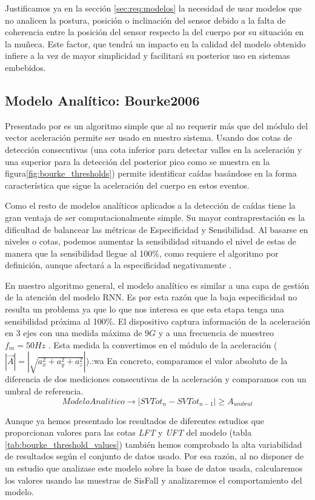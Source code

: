 Justificamos ya en la sección \ref{sec:req:modelos} la necesidad de usar modelos que no analicen la postura, posición o inclinación del sensor debido a la falta de coherencia entre la posición del sensor respecto la del cuerpo por su situación en la muñeca. Este factor, que tendrá un impacto en la calidad del modelo obtenido infiere a la vez de mayor simplicidad y facilitará su posterior uso en sistemas embebidos.

\subsection{Modelo Analítico: Bourke2006}\label{sub:imp:model:analitico}

Presentado por  es un algoritmo simple que al no requerir más que del módulo del vector aceleración permite ser usado en nuestro sistema. Usando dos cotas de detección consecutivas (una cota inferior para detectar valles en la aceleración y una superior para la detección del posterior pico como se muestra en la figura\ref{fig:bourke_thresholds}) permite identificar caídas basándose en la forma característica que sigue la aceleración del cuerpo en estos eventos.

Como el resto de modelos analíticos aplicados a la detección de caídas tiene la gran ventaja de ser computacionalmente simple. Su mayor contraprestación es la dificultad de balancear las métricas de Especificidad y Sensibilidad. Al basarse en niveles o cotas, podemos aumentar la sensibilidad situando el nivel de estas de manera que la sensibilidad llegue al 100\%, como requiere el algoritmo por definición, aunque afectará a la especificidad negativamente \cite{Aziz2017}. 

En nuestro algoritmo general, el modelo analítico es similar a una capa de gestión de la atención del modelo RNN. Es por esta razón que la baja especificidad  no resulta un problema ya que lo que nos interesa es que esta etapa tenga una sensibilidad próxima al 100\%. El dispositivo captura información de la aceleración en 3 ejes con una medida máxima de $9G$ y a una frecuencia de muestreo $f_m=50Hz$ . Esta medida la convertimos en el módulo de la aceleración ($|\vec{A}| = |\sqrt{a_{x}^2+a_{y}^2+a_{z}^2}|$).:wa En concreto, comparamos el valor absoluto de la diferencia de dos mediciones consecutivas de la aceleración y comparamos con un umbral de referencia.
\[
ModeloAnalitico\rightarrow |SVTot_n - SVTot_{n-1}|\geq A_{umbral}
\]


Aunque ya hemos presentado los resultados de diferentes estudios que proporcionan valores para las cotas \textit{LFT} y \textit{UFT} del modelo (tabla \ref{tab:bourke_threshold_values}) también hemos comprobado la alta variabilidad de resultados según el conjunto de datos usado. Por esa razón, al no disponer de un estudio que analizase este modelo sobre la base de datos usada, calcularemos los valores usando las muestras de SisFall y analizaremos el comportamiento del modelo.

